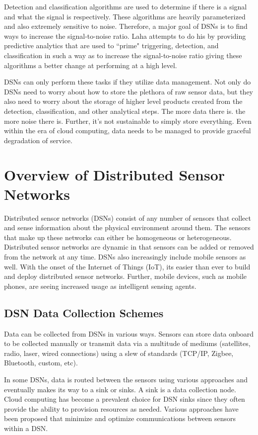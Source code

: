 Detection and classification algorithms are used to determine if there is a signal and what the signal is respectively. These algorithms are heavily parameterized and also extremely sensitive to noise. Therefore, a major goal of DSNs is to find ways to increase the signal-to-noise ratio. Laha attempts to do his by providing predictive analytics that are used to ``prime" triggering, detection, and classification in such a way as to increase the signal-to-noise ratio giving these algorithms a better change at performing at a high level.

DSNs can only perform these tasks if they utilize data management. Not only do DSNs need to worry about how to store the plethora of raw sensor data, but they also need to worry about the storage of higher level products created from the detection, classification, and other analytical steps. The more data there is. the more noise there is. Further, it's not sustainable to simply store everything. Even within the era of cloud computing, data needs to be managed to provide graceful degradation of service.

\section{Overview of Distributed Sensor Networks}
Distributed sensor networks (DSNs) consist of any number of sensors that collect and sense information about the physical environment around them. The sensors that make up these networks can either be homogeneous or heterogeneous. Distributed sensor networks are dynamic in that sensors can be added or removed from the network at any time. DSNs also increasingly include mobile sensors as well. With the onset of the Internet of Things (IoT), its easier than ever to build and deploy distributed sensor networks. Further, mobile devices, such as mobile phones, are seeing increased usage as intelligent sensing agents.

\subsection{DSN Data Collection Schemes}
Data can be collected from DSNs in various ways. Sensors can store data onboard to be collected manually or transmit data via a multitude of mediums (satellites, radio, laser, wired connections) using a slew of standards (TCP/IP, Zigbee, Bluetooth, custom, etc).

In some DSNs, data is routed between the sensors using various approaches and eventually makes its way to a sink or sinks. A sink is a data collection node. Cloud computing has become a prevalent choice for DSN sinks since they often provide the ability to provision resources as needed. Various approaches have been proposed that minimize and optimize communications between sensors within a DSN.

